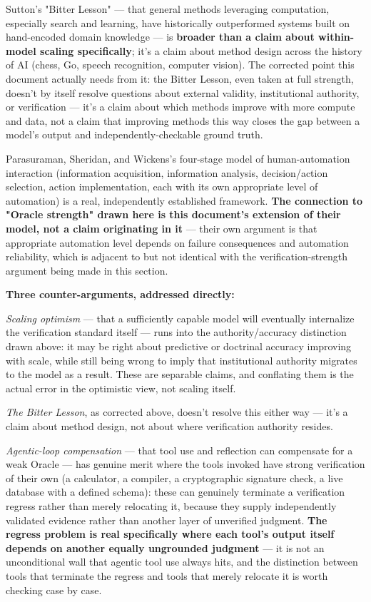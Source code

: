 Sutton's "Bitter Lesson" --- that general methods leveraging computation, especially search and learning, have historically outperformed systems built on hand-encoded domain knowledge --- is \textbf{broader than a claim about within-model scaling specifically}; it's a claim about method design across the history of AI (chess, Go, speech recognition, computer vision). The corrected point this document actually needs from it: the Bitter Lesson, even taken at full strength, doesn't by itself resolve questions about external validity, institutional authority, or verification --- it's a claim about which methods improve with more compute and data, not a claim that improving methods this way closes the gap between a model's output and independently-checkable ground truth.

Parasuraman, Sheridan, and Wickens's four-stage model of human-automation interaction (information acquisition, information analysis, decision/action selection, action implementation, each with its own appropriate level of automation) is a real, independently established framework. \textbf{The connection to "Oracle strength" drawn here is this document's extension of their model, not a claim originating in it} --- their own argument is that appropriate automation level depends on failure consequences and automation reliability, which is adjacent to but not identical with the verification-strength argument being made in this section.

\textbf{Three counter-arguments, addressed directly:}

\emph{Scaling optimism} --- that a sufficiently capable model will eventually internalize the verification standard itself --- runs into the authority/accuracy distinction drawn above: it may be right about predictive or doctrinal accuracy improving with scale, while still being wrong to imply that institutional authority migrates to the model as a result. These are separable claims, and conflating them is the actual error in the optimistic view, not scaling itself.

\emph{The Bitter Lesson}, as corrected above, doesn't resolve this either way --- it's a claim about method design, not about where verification authority resides.

\emph{Agentic-loop compensation} --- that tool use and reflection can compensate for a weak Oracle --- has genuine merit where the tools invoked have strong verification of their own (a calculator, a compiler, a cryptographic signature check, a live database with a defined schema): these can genuinely terminate a verification regress rather than merely relocating it, because they supply independently validated evidence rather than another layer of unverified judgment. \textbf{The regress problem is real specifically where each tool's output itself depends on another equally ungrounded judgment} --- it is not an unconditional wall that agentic tool use always hits, and the distinction between tools that terminate the regress and tools that merely relocate it is worth checking case by case.
